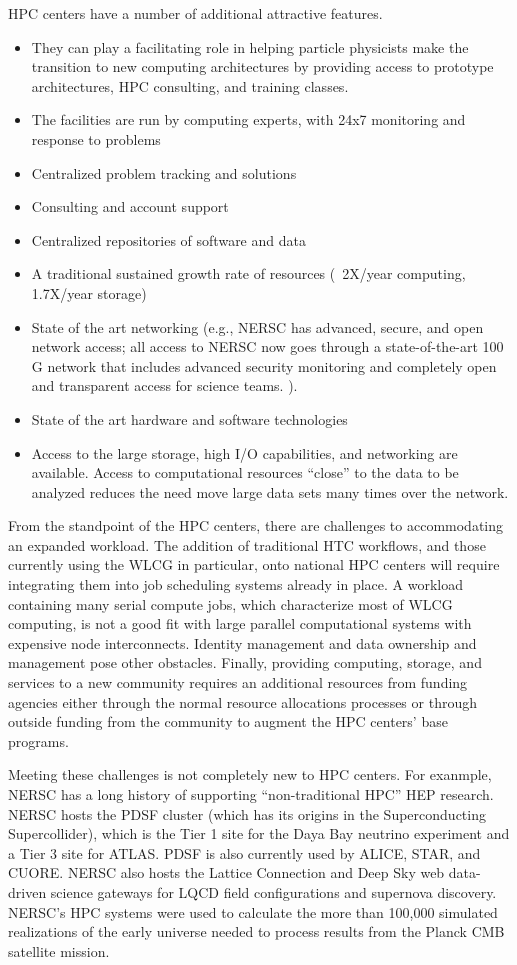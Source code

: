 HPC centers have a number of additional attractive features.

\begin{itemize} 
\item{They can play a facilitating role in helping particle physicists make the transition to new computing architectures by providing access to prototype architectures, HPC consulting, and training classes.}
\item{The facilities are run by computing experts, with 24x7 monitoring and response to problems}
\item{Centralized problem tracking and solutions}
\item{Consulting and account support}
\item{Centralized repositories of software and data}
\item{A traditional sustained growth rate of resources (~2X/year computing, 1.7X/year storage)}
\item{State of the art networking (e.g., NERSC has advanced, secure, and open network access; all access to NERSC now goes through a state-of-the-art 100 G network that includes advanced security monitoring and completely open and transparent access for science teams. ).}
\item{State of the art hardware and software technologies}
\item{Access to the large storage, high I/O capabilities, and networking are available.  Access to computational resources ``close'' to the data to be analyzed reduces the need move large data sets many times over the network.}
\end{itemize} 

From the standpoint of the HPC centers, there are challenges to accommodating an expanded workload. The addition of traditional HTC workflows, and those currently using the WLCG in particular, onto 
national HPC centers will require integrating them into job scheduling systems already in place. 
A workload containing many serial compute jobs, which characterize most of WLCG computing, 
is not a good fit with large parallel computational systems with expensive node interconnects. 
Identity management and data ownership and management pose other obstacles. Finally, providing 
computing, storage, and services to a new community requires an additional resources from 
funding agencies either through the normal resource allocations processes or through outside 
funding from the community to augment the HPC centers' base programs.
 
Meeting these challenges is not completely new to HPC centers. For exanmple,
NERSC has a long history of supporting ``non-traditional HPC'' HEP research.  
NERSC hosts the PDSF cluster (which has its origins in the Superconducting Supercollider), 
which is the Tier 1 site for the Daya Bay neutrino experiment and 
a Tier 3 site for ATLAS. PDSF is also currently used by ALICE, STAR, and CUORE. 
 NERSC also hosts the Lattice Connection and Deep Sky web data-driven science gateways for 
LQCD field configurations  and supernova discovery. 
NERSC's HPC systems were used to calculate the more than 100,000 simulated realizations of the 
early universe needed to process results from the Planck CMB satellite mission. 


